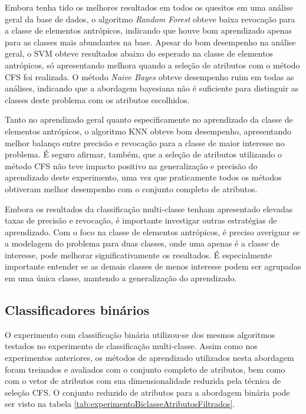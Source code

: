Embora tenha tido os melhores resultados em todos os quesitos em uma análise geral da base de dados, o algoritmo \textit{Random Forest} obteve baixa revocação para a classe de elementos antrópicos, indicando que houve bom aprendizado apenas para as classes mais abundantes na base. Apesar do bom desempenho na análise geral, o SVM obteve resultados abaixo do esperado na classe de elementos antrópicos, só apresentando melhora quando a seleção de atributos com o método CFS foi realizada. O método \textit{Naive Bayes} obteve desempenho ruim em todas as análises, indicando que a abordagem bayesiana não é suficiente para distinguir as classes deste problema com os atributos escolhidos.

Tanto no aprendizado geral quanto especificamente no aprendizado da classe de elementos antrópicos, o algoritmo KNN obteve bom desempenho, apresentando melhor balanço entre precisão e revocação para a classe de maior interesse no problema. É seguro afirmar, também, que a seleção de atributos utilizando o método CFS não teve impacto positivo na generalização e precisão do aprendizado deste experimento, uma vez que praticamente todos os métodos obtiveram melhor desempenho com o conjunto completo de atributos.

Embora os resultados da classificação multi-classe tenham apresentado elevadas taxas de precisão e revocação, é importante investigar outras estratégias de aprendizado. Com o foco na classe de elementos antrópicos, é preciso averiguar se a modelagem do problema para duas classes, onde uma apenas é a classe de interesse, pode melhorar significativamente os resultados. É especialmente importante entender se as demais classes de menos interesse podem ser agrupadas em uma única classe, mantendo a generalização do aprendizado.

\subsection{Classificadores binários}

O experimento com classificação binária utilizou-se dos mesmos algoritmos testados no experimento de classificação multi-classe. Assim como nos experimentos anteriores, os métodos de aprendizado utilizados nesta abordagem foram treinados e avaliados com o conjunto completo de atributos, bem como com o vetor de atributos com sua dimensionalidade reduzida pela técnica de seleção CFS. O conjunto reduzido de atributos para a abordagem binária pode ser visto na tabela \ref{tab:experimentoBiclasseAtributosFiltrados}.

